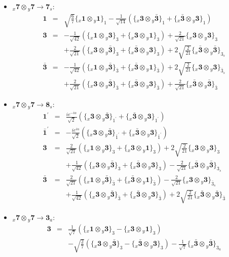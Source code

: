 \documentclass[english]{article}
\newcommand{\rep}[1]{\mathbf{#1}}
\newcommand{\repx}[2]{{}_{#2}\mathbf{#1}}
\newcommand{\subcg}[3]{\big\{ \repx{#1}{x}\otimes\repx{#2}{y}\big\}^{}_{#3}}
\begin{document}
\begin{itemize}
\item $\repx{7}{x}\otimes\repx{7}{y}\to\rep{7}_{s}$:
\begin{eqnarray*}
\rep{1} &=& \sqrt{\frac{6}{7}}\subcg{1}{1}{1}-\frac{1}{\sqrt{14}}\left(\subcg{3}{\bar{3}}{1}+\subcg{\bar{3}}{3}{1}\right)
\\
\rep{3} &=& -\frac{1}{\sqrt{42}}\left(\subcg{1}{3}{3}+\subcg{3}{1}{3}\right)+\frac{2}{\sqrt{21}}\subcg{3}{3}{3} \\ 
 & & +\frac{2}{\sqrt{21}}\left(\subcg{3}{\bar{3}}{3}+\subcg{\bar{3}}{3}{3}\right)+2 \sqrt{\frac{2}{21}}\subcg{\bar{3}}{\bar{3}}{3_{s}}
\\
\rep{\bar{3}} &=& -\frac{1}{\sqrt{42}}\left(\subcg{1}{\bar{3}}{\bar{3}}+\subcg{\bar{3}}{1}{\bar{3}}\right)+2 \sqrt{\frac{2}{21}}\subcg{3}{3}{\bar{3}_{s}} \\ 
 & & +\frac{2}{\sqrt{21}}\left(\subcg{3}{\bar{3}}{\bar{3}}+\subcg{\bar{3}}{3}{\bar{3}}\right)+\frac{2}{\sqrt{21}}\subcg{\bar{3}}{\bar{3}}{\bar{3}}
\end{eqnarray*}
\item $\repx{7}{x}\otimes\repx{7}{y}\to\rep{8}_{s}$:
\begin{eqnarray*}
\rep{1^{\prime}} &=& \frac{i e^{-i \alpha }}{\sqrt{2}}\left(\subcg{3}{\bar{3}}{1^{\prime}}+\subcg{\bar{3}}{3}{1^{\prime}}\right)
\\
\rep{\bar{1}^{\prime}} &=& -\frac{i e^{i \alpha }}{\sqrt{2}}\left(\subcg{3}{\bar{3}}{\bar{1}^{\prime}}+\subcg{\bar{3}}{3}{\bar{1}^{\prime}}\right)
\\
\rep{3} &=& \frac{2}{\sqrt{21}}\left(\subcg{1}{3}{3}+\subcg{3}{1}{3}\right)+2 \sqrt{\frac{2}{21}}\subcg{3}{3}{3} \\ 
 & & +\frac{1}{\sqrt{42}}\left(\subcg{3}{\bar{3}}{3}+\subcg{\bar{3}}{3}{3}\right)-\frac{2}{\sqrt{21}}\subcg{\bar{3}}{\bar{3}}{3_{s}}
\\
\rep{\bar{3}} &=& \frac{2}{\sqrt{21}}\left(\subcg{1}{\bar{3}}{\bar{3}}+\subcg{\bar{3}}{1}{\bar{3}}\right)-\frac{2}{\sqrt{21}}\subcg{3}{3}{\bar{3}_{s}} \\ 
 & & +\frac{1}{\sqrt{42}}\left(\subcg{3}{\bar{3}}{\bar{3}}+\subcg{\bar{3}}{3}{\bar{3}}\right)+2 \sqrt{\frac{2}{21}}\subcg{\bar{3}}{\bar{3}}{\bar{3}}
\end{eqnarray*}
\item $\repx{7}{x}\otimes\repx{7}{y}\to\rep{3}_{a}$:
\begin{eqnarray*}
\rep{3} &=& \frac{1}{\sqrt{7}}\left(\subcg{1}{3}{3}-\subcg{3}{1}{3}\right) \\ 
 & & -\sqrt{\frac{2}{7}}\left(\subcg{3}{\bar{3}}{3}-\subcg{\bar{3}}{3}{3}\right)-\frac{1}{\sqrt{7}}\subcg{\bar{3}}{\bar{3}}{3_{a}}

\end{eqnarray*}
\end{itemize}
\end{document}
